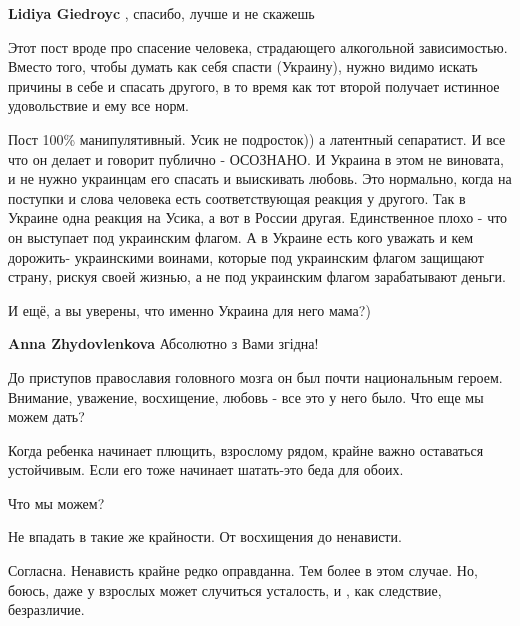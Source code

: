 \begin{itemize}
\begin{itemize}
\textbf{Lidiya Giedroyc} , спасибо, лучше и не скажешь

\end{itemize} %


Этот пост вроде про спасение человека, страдающего алкогольной зависимостью.
Вместо того, чтобы думать как себя спасти (Украину), нужно видимо искать
причины в себе и спасать другого, в то время как тот второй получает истинное
удовольствие и ему все норм.

Пост 100\% манипулятивный. Усик не подросток)) а латентный сепаратист. И все что
он делает и говорит публично - ОСОЗНАНО. И Украина в этом не виновата, и не
нужно украинцам его спасать и выискивать любовь. Это нормально, когда на
поступки и слова человека есть соответствующая реакция у другого. Так в Украине
одна реакция на Усика, а вот в России другая. Единственное плохо - что он
выступает под украинским флагом. А в Украине есть кого уважать и кем дорожить-
украинскими воинами, которые под украинским флагом защищают страну, рискуя
своей жизнью, а не под украинским флагом зарабатывают деньги.

И ещё, а вы уверены, что именно Украина для него мама?)

\begin{itemize} %
\textbf{Anna Zhydovlenkova} Абсолютно з Вами згідна!
\end{itemize} %


До приступов православия головного мозга он был почти национальным героем.
Внимание, уважение, восхищение, любовь - все это у него было. Что еще мы можем
дать?

\begin{itemize} %

Когда ребенка начинает плющить, взрослому рядом, крайне важно оставаться
устойчивым. Если его тоже начинает шатать-это беда для обоих.

Что мы можем?

Не впадать в такие же крайности. От восхищения до ненависти.


Согласна. Ненависть крайне редко оправданна. Тем более в этом случае. Но,
боюсь, даже у взрослых может случиться усталость, и , как следствие,
безразличие.



\end{itemize}
\end{itemize}

